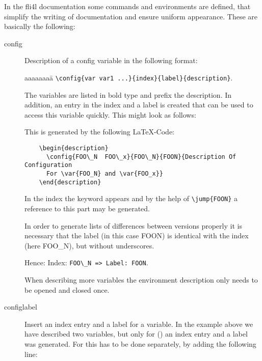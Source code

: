 In the fli4l documentation some commands and environments are defined,
that simplify the writing of documentation and ensure uniform appearance. 
These are basically the following:

\begin{description}
\item [config] Description of a config variable in the following format:
  \begin{tabbing}
    aaaaaaaa\=\kill
    \>\verb*?\config{var var1 ...}{index}{label}{description}?.
  \end{tabbing}

  The variables are listed in bold type and prefix the description.
  In addition, an entry in the index and a label is created that can
  be used to access this variable quickly. This might look as follows:

  \begin{description}
  \end{description}

  This is generated by the following \LaTeX-Code:

\begin{verbatim}
    \begin{description}
      \config{FOO\_N  FOO\_x}{FOO\_N}{FOON}{Description Of Configuration
      For \var{FOO_N} and \var{FOO_x}}
    \end{description}
\end{verbatim}

  In the index the keyword  appears and by the help of
  \verb*?\jump{FOON}? a reference to this part may be generated.

  In order to generate lists of differences between versions properly
  it is necessary that the label (in this case FOON) is identical with the index
  (here FOO\_N), but without underscores.

  Hence: Index: \verb?FOO\_N => Label: FOON?.

  When describing more variables the environment \glqq{}description\grqq{}
  only needs to be opened and closed once.

\item [configlabel]Insert an index entry and a label for
  a variable. In the example above we have described two variables,
  but only for () an index entry and a label was generated. 
  For  this has to be done separately, by adding the
  following line:


\end{description}
